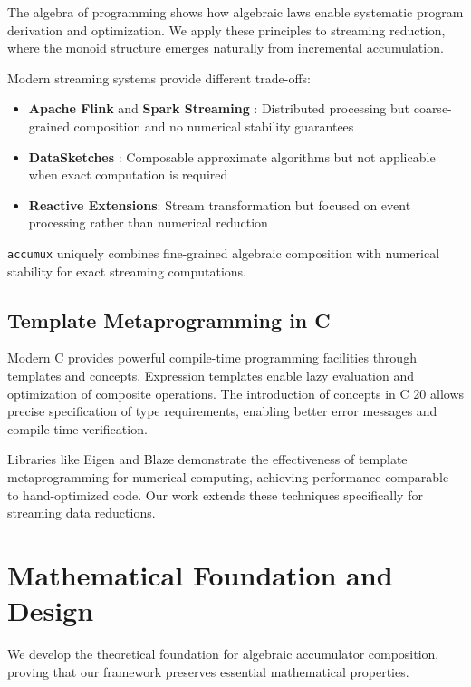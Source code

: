 \documentclass[sigconf]{acmart}
\newcommand{\accumux}{\texttt{accumux}\xspace}
\newcommand{\cpp}{C\nolinebreak\hspace{-.05em}\raisebox{.4ex}{\tiny\bf +}\nolinebreak\hspace{-.10em}\raisebox{.4ex}{\tiny\bf +}\xspace}
\begin{document}
The algebra of programming \cite{bird1997algebra} shows how algebraic laws enable systematic program derivation and optimization. We apply these principles to streaming reduction, where the monoid structure emerges naturally from incremental accumulation.

Modern streaming systems provide different trade-offs:
\begin{itemize}
\item \textbf{Apache Flink} \cite{carbone2015apache} and \textbf{Spark Streaming} \cite{zaharia2013discretized}: Distributed processing but coarse-grained composition and no numerical stability guarantees
\item \textbf{DataSketches} \cite{rhodes2021datasketches}: Composable approximate algorithms but not applicable when exact computation is required
\item \textbf{Reactive Extensions}: Stream transformation but focused on event processing rather than numerical reduction
\end{itemize}

\accumux uniquely combines fine-grained algebraic composition with numerical stability for exact streaming computations.

\subsection{Template Metaprogramming in \cpp}

Modern \cpp provides powerful compile-time programming facilities through templates and concepts. Expression templates \cite{veldhuizen1995expression} enable lazy evaluation and optimization of composite operations. The introduction of concepts in \cpp20 \cite{sutton2017concepts} allows precise specification of type requirements, enabling better error messages and compile-time verification.

Libraries like Eigen \cite{guennebaud2010eigen} and Blaze \cite{iglberger2012expression} demonstrate the effectiveness of template metaprogramming for numerical computing, achieving performance comparable to hand-optimized code. Our work extends these techniques specifically for streaming data reductions.

\section{Mathematical Foundation and Design}

We develop the theoretical foundation for algebraic accumulator composition, proving that our framework preserves essential mathematical properties.
\end{document}
